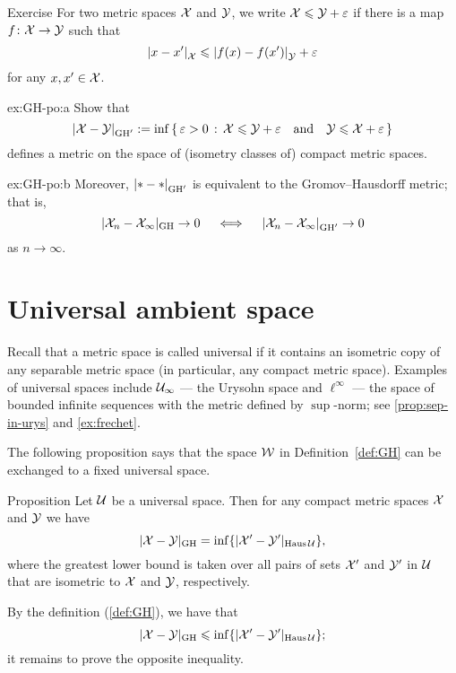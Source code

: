 \begin{thm}{Exercise}\label{ex:GH-po}
For two metric spaces $\mathcal{X}$ and $\mathcal{Y}$,
we write $\mathcal{X}\leqslant \mathcal{Y}+\varepsilon$ if
there is a map $f\colon\mathcal{X}\to \mathcal{Y}$ such that 
\[\dist{x}{x'}{\spc{X}}\le \dist{f(x)}{f(x')}{\spc{Y}}+\eps\]
for any $x,x'\in \mathcal{X}$.

\begin{subthm}{ex:GH-po:a}
Show that 
$$\dist{\spc{X}}{\spc{Y}}{\GH'}
\df
\inf\set{\eps>0}{\spc{X}\le \spc{Y}+\eps
\quad\text{and}\quad
\spc{Y}\le \spc{X}+\eps}$$
defines a metric on the space of (isometry classes of) compact metric spaces.
\end{subthm}

\begin{subthm}{ex:GH-po:b}
Moreover, $\dist{*}{*}{\GH'}$ is equivalent to the Gromov--Hausdorff metric;
that is,
$$|\spc{X}_n-\spc{X}_\infty|_{\GH}\to 0 
\quad\iff\quad 
\dist{\spc{X}_n}{\spc{X}_\infty}{\GH'}\to 0$$ 
as $n\to\infty$.
\end{subthm}
\end{thm}

\section{Universal ambient space}

Recall that a metric space is called universal if it contains an isometric copy of any separable metric space (in particular, any compact metric space).
Examples of universal spaces include $\mathcal{U}_\infty$ --- the Urysohn space and $\ell^\infty$ --- the space of bounded infinite sequences with the metric defined by $\sup$-norm; see \ref{prop:sep-in-urys} and \ref{ex:frechet}.

The following proposition says that the space $\mathcal{W}$ in Definition~\ref{def:GH} can be exchanged to a fixed universal space.

\begin{thm}{Proposition}\label{prop:GH-with-fixed-Z}
Let $\mathcal{U}$ be a universal space.
Then for any compact metric spaces $\mathcal{X}$ and $\mathcal{Y}$ we have
$$|\mathcal{X}-\mathcal{Y}|_{\operatorname{\rm GH}\nolimits} = \inf \{|\mathcal{X}'-\mathcal{Y}'|_{\operatorname{\rm Haus}\nolimits\mathcal{U}}\},$$ 
where the greatest lower bound is taken over all pairs of sets $\mathcal{X}'$ and $\mathcal{Y}'$ in $\mathcal{U}$
that are isometric to  $\mathcal{X}$ and $\mathcal{Y}$, respectively.  
\end{thm}




By the definition (\ref{def:GH}), we have that 
\[|\mathcal{X}-\mathcal{Y}|_{\operatorname{\rm GH}\nolimits} \leqslant \inf \{|\mathcal{X}'-\mathcal{Y}'|_{\operatorname{\rm Haus}\nolimits\mathcal{U}}\};\]
it remains to prove the opposite inequality.

